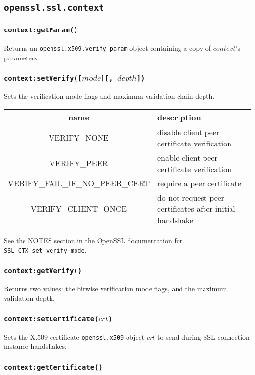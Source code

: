 \documentclass[11pt, oneside]{memoir}
\newcommand*{\fn}[1]{\texttt{#1}\xspace}
\newcommand*{\module}[1]{\texttt{#1}\xspace}
\newcounter{toccols}
\newenvironment{Module}[1]{
	\subsection{\texttt{#1}}
	\addtocontents{toc}{
		\protect\begin{multicols}{\value{toccols}}
	}
}{
	\addtocontents{toc}{\protect\end{multicols}}
}
\begin{document}
\begin{Module}{openssl.ssl.context}
\subsubsection[\fn{context:getParam}]{\fn{context:getParam()}}

Returns an \module{openssl.x509.verify\_param} object containing a copy of $context$'s parameters.

\subsubsection[\fn{context:setVerify}]{\fn{context:setVerify([$mode$][, $depth$])}}

Sets the verification mode flags and maximum validation chain depth.

\begin{tabular}{ c | l }
name & description \\\hline
VERIFY\_NONE & disable client peer certificate verification \\
VERIFY\_PEER & enable client peer certificate verification \\
VERIFY\_FAIL\_IF\_NO\_PEER\_CERT & require a peer certificate \\
VERIFY\_CLIENT\_ONCE & do not request peer certificates after initial handshake
\end{tabular}

See the \href{http://www.openssl.org/docs/ssl/SSL_CTX_set_verify.html#NOTES}{NOTES section} in the OpenSSL documentation for \fn{SSL\_CTX\_set\_verify\_mode}.

\subsubsection[\fn{context:getVerify}]{\fn{context:getVerify()}}

Returns two values: the bitwise verification mode flags, and the maximum validation depth.

\subsubsection[\fn{context:setCertificate}]{\fn{context:setCertificate($crt$)}}

Sets the X.509 certificate \module{openssl.x509} object $crt$ to send during SSL connection instance handshakes.

\subsubsection[\fn{context:getCertificate}]{\fn{context:getCertificate()}}


\end{Module}
\end{document}
